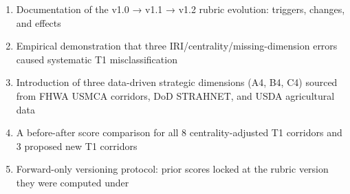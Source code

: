 \begin{enumerate}
\item Documentation of the v1.0 → v1.1 → v1.2 rubric evolution: triggers, changes, and effects
\item Empirical demonstration that three IRI/centrality/missing-dimension errors caused systematic T1 misclassification
\item Introduction of three data-driven strategic dimensions (A4, B4, C4) sourced from FHWA USMCA corridors, DoD STRAHNET, and USDA agricultural data
\item A before-after score comparison for all 8 centrality-adjusted T1 corridors and 3 proposed new T1 corridors
\item Forward-only versioning protocol: prior scores locked at the rubric version they were computed under
\end{enumerate}
